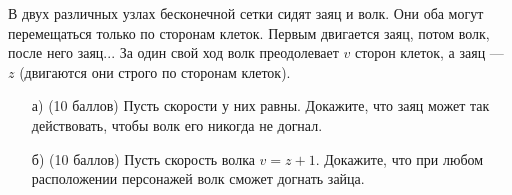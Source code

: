
В двух различных узлах бесконечной сетки сидят заяц и волк. 
	Они оба могут
	перемещаться только по сторонам клеток. Первым двигается заяц,
	потом волк, после него заяц... За один свой ход волк 
	преодолевает $v$ сторон клеток, а заяц --- $z$ 
	(двигаются они строго по сторонам клеток).
    
    \begin{enumerate}
    	\item[а)] (10 баллов) Пусть скорости у них равны. 
	Докажите, что заяц может так
	действовать, чтобы волк его никогда не догнал. 
        \item[б)] (10 баллов) Пусть скорость волка $v = z+1$.	
	Докажите, что при любом расположении персонажей 
    волк сможет догнать зайца.
\end{enumerate}